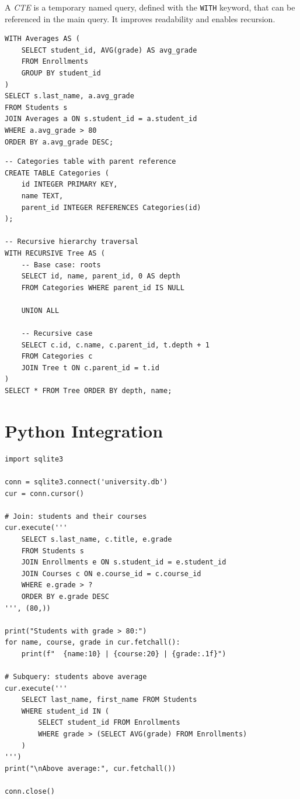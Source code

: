 \begin{definition}
A \emph{CTE} is a temporary named query, defined with the \texttt{WITH}
keyword, that can be referenced in the main query. It improves readability
and enables recursion.
\end{definition}

\begin{codeblock}[title=\textbf{Simple CTE}]
\begin{verbatim}
WITH Averages AS (
    SELECT student_id, AVG(grade) AS avg_grade
    FROM Enrollments
    GROUP BY student_id
)
SELECT s.last_name, a.avg_grade
FROM Students s
JOIN Averages a ON s.student_id = a.student_id
WHERE a.avg_grade > 80
ORDER BY a.avg_grade DESC;
\end{verbatim}
\end{codeblock}

\begin{codeblock}[title=\textbf{Recursive CTE --- Hierarchy}]
\begin{verbatim}
-- Categories table with parent reference
CREATE TABLE Categories (
    id INTEGER PRIMARY KEY,
    name TEXT,
    parent_id INTEGER REFERENCES Categories(id)
);

-- Recursive hierarchy traversal
WITH RECURSIVE Tree AS (
    -- Base case: roots
    SELECT id, name, parent_id, 0 AS depth
    FROM Categories WHERE parent_id IS NULL

    UNION ALL

    -- Recursive case
    SELECT c.id, c.name, c.parent_id, t.depth + 1
    FROM Categories c
    JOIN Tree t ON c.parent_id = t.id
)
SELECT * FROM Tree ORDER BY depth, name;
\end{verbatim}
\end{codeblock}

\section{Python Integration}

\begin{codeblock}[title=\textbf{Joins and Subqueries with Python}]
\begin{verbatim}
import sqlite3

conn = sqlite3.connect('university.db')
cur = conn.cursor()

# Join: students and their courses
cur.execute('''
    SELECT s.last_name, c.title, e.grade
    FROM Students s
    JOIN Enrollments e ON s.student_id = e.student_id
    JOIN Courses c ON e.course_id = c.course_id
    WHERE e.grade > ?
    ORDER BY e.grade DESC
''', (80,))

print("Students with grade > 80:")
for name, course, grade in cur.fetchall():
    print(f"  {name:10} | {course:20} | {grade:.1f}")

# Subquery: students above average
cur.execute('''
    SELECT last_name, first_name FROM Students
    WHERE student_id IN (
        SELECT student_id FROM Enrollments
        WHERE grade > (SELECT AVG(grade) FROM Enrollments)
    )
''')
print("\nAbove average:", cur.fetchall())

conn.close()
\end{verbatim}
\end{codeblock}


